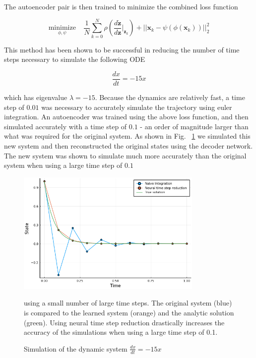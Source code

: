\documentclass[12pt, letterpaper]{article}
\begin{document}
The autoencoder pair is then trained to minimize the combined loss function

\begin{equation}
        \underset{\phi, \psi}{\text{minimize}} \; \; \; \; \frac{1}{N} \overset{N}{\underset{k=0}{\sum}}\rho\left( \frac{d \dot{\mathbf{z}}}{d \mathbf{z}} \Big|_{\mathbf{z}_k} \right) + ||\mathbf{x}_k - \psi(\phi(\mathbf{x}_k))||_2^2 
\end{equation}

This method has been shown to be successful in reducing the number of time steps necessary to simulate the following ODE

\begin{equation}
    \frac{dx}{dt} = -15x
\end{equation}

which has eigenvalue $\lambda = -15$.  Because the dynamics are relatively fast, a time step of $0.01$ was necessary to accurately simulate the trajectory using euler integration.  An autoencoder was trained using the above loss function, and then simulated accurately with a time step of $0.1$ - an order of magnitude larger than what was required for the original system.  As shown in Fig. ~\ref{fig:neural_time_step} we simulated this new system and then reconstructed the original states using the decoder network.  The new system was shown to simulate much more accurately than the original system when using a large time step of $0.1$

\begin{figure}[hbt!]
\centering
\includegraphics[width=0.8\textwidth]{figures/neural_time_step.png}
    \caption{Simulation of the dynamic system $\frac{dx}{dt} = -15x$} using a small number of large time steps.  The original system (blue) is compared to the learned system (orange) and the analytic solution (green).  Using neural time step reduction drastically increases the accuracy of the simulations when using a large time step of 0.1.
\label{fig:neural_time_step}
\end{figure}
\end{document}
